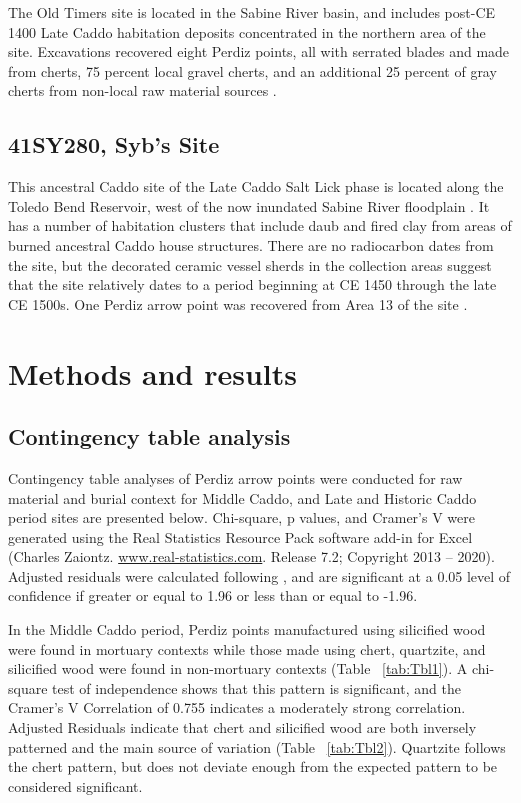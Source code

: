 \documentclass[review]{elsarticle}
\begin{document}
The Old Timers site is located in the Sabine River basin, and includes post-CE 1400 Late Caddo habitation deposits concentrated in the northern area of the site. Excavations recovered eight Perdiz points, all with serrated blades and made from cherts, 75 percent local gravel cherts, and an additional 25 percent of gray cherts from non-local raw material sources \citep[77]{RN8966}.

\subsection*{41SY280, Syb’s Site} 

This ancestral Caddo site of the Late Caddo Salt Lick phase is located along the Toledo Bend Reservoir, west of the now inundated Sabine River floodplain \citep[Figure 55]{RN8966}. It has a number of habitation clusters that include daub and fired clay from areas of burned ancestral Caddo house structures. There are no radiocarbon dates from the site, but the decorated ceramic vessel sherds in the collection areas suggest that the site relatively dates to a period beginning at CE 1450 through the late CE 1500s. One Perdiz arrow point was recovered from Area 13 of the site \citep[Table 33]{RN8966}.

\section*{Methods and results}

\subsection*{Contingency table analysis}

Contingency table analyses of Perdiz arrow points were conducted for raw material and burial context for Middle Caddo, and Late and Historic Caddo period sites are presented below. Chi-square, p values, and Cramer’s V were generated using the Real Statistics Resource Pack software add-in for Excel (Charles Zaiontz. \href{www.real-statistics.com}{www.real-statistics.com}. Release 7.2; Copyright 2013 – 2020). Adjusted residuals were calculated following \citet{RN8987}, and are significant at a 0.05 level of confidence if greater or equal to 1.96 or less than or equal to -1.96. 

In the Middle Caddo period, Perdiz points manufactured using silicified wood were found in mortuary contexts while those made using chert, quartzite, and silicified wood were found in non-mortuary contexts (Table ~\ref{tab:Tbl1}). A chi-square test of independence shows that this pattern is significant, and the Cramer’s V Correlation of 0.755 indicates a moderately strong correlation. Adjusted Residuals indicate that chert and silicified wood are both inversely patterned and the main source of variation (Table ~\ref{tab:Tbl2}). Quartzite follows the chert pattern, but does not deviate enough from the expected pattern to be considered significant.
\end{document}

